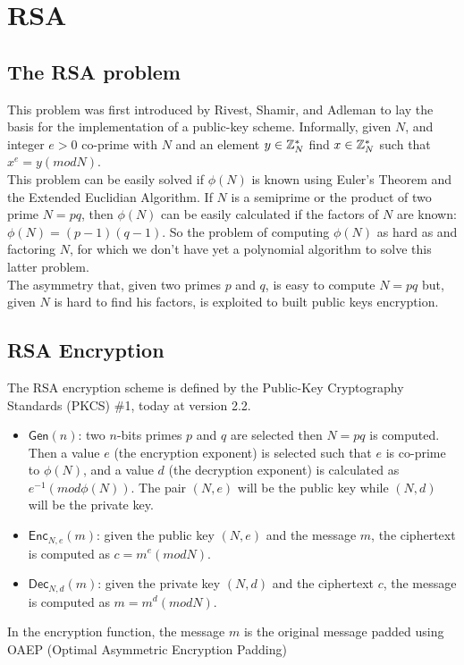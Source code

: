 \section{RSA}
\subsection{The RSA problem}
This problem was first introduced by Rivest, Shamir, and Adleman to lay the basis for the implementation of a public-key scheme. Informally, given $N$, and integer $e > 0$  co-prime with $N$ and an element $y \in \mathbb{Z}_N^{*}$ find $x \in \mathbb{Z}_N^{*}$ such that $x^e = y (mod N)$.\\
This problem can be easily solved if $\phi(N)$ is known using Euler's Theorem and the Extended Euclidian Algorithm. If $N$ is a semiprime or the product of two prime $N = pq$, then $\phi(N)$ can be easily calculated if the factors of $N$ are known: $\phi(N) = (p-1)(q-1)$. So the problem of computing $\phi(N)$ as hard as and factoring $N$, for which we don't have yet a polynomial algorithm to solve this latter problem.\\
The asymmetry that, given two primes $p$ and $q$, is easy to compute $N = pq$ but, given $N$ is hard to find his factors, is exploited to built public keys encryption.

\subsection{RSA Encryption}
The RSA encryption scheme is defined by the Public-Key Cryptography Standards (PKCS) \#1, today at version 2.2.
\begin{itemize}
    \item{$\mathsf{Gen}(n)$: two $n$-bits primes $p$ and $q$ are selected then $N = pq$ is computed. Then a value $e$ (the encryption exponent) is selected such that $e$ is co-prime to $\phi(N)$, and a value $d$ (the decryption exponent) is calculated as $e^{-1} (mod \phi(N))$. The pair $(N, e)$ will be the public key while $(N, d)$ will be the private key.}
    \item{$\mathsf{Enc}_{N,e}(m)$: given the public key $(N, e)$ and the message $m$, the ciphertext is computed as $c = m^e (mod N)$.}
    \item{$\mathsf{Dec}_{N,d}(m)$: given the private key $(N, d)$ and the ciphertext $c$, the message is computed as $m = m^d (mod N)$.}
\end{itemize}
In the encryption function, the message $m$ is the original message padded using OAEP (Optimal Asymmetric Encryption Padding)
